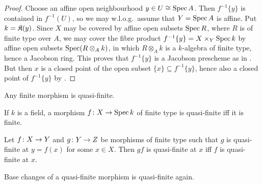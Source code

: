 \documentclass[a4paper,parskip=half,numbers=enddot, DIV=12]{scrreprt}
\begin{document}
\begin{proof}
	Choose an affine open neighbourhood $y\in U\cong \operatorname{Spec} A$. Then $f^{-1}\{y\}$ is contained in $f^{-1}(U)$, so we may w.l.o.g.\ assume that $Y=\operatorname{Spec} A$ is affine. Put $k=\mathfrak{K}(y)$. Since $X$ may be covered by affine open subsets $\operatorname{Spec} R$, where $R$ is of finite type over $A$, we may cover the fibre product $f^{-1}\{y\}=X\times_Y\operatorname{Spec} k$ by affine open subsets $\operatorname{Spec} (R\otimes_A k)$, in which $R\otimes_A k$ is a $k$-algebra of finite type, hence a Jacobson ring. This proves that $f^{-1}\{y\}$ is a Jacobson prescheme as in \cite[Definition~2.4.2]{alggeo1}. But then $x$ is a closed point of the open subset $\{x\}\subseteq f^{-1}\{y\}$, hence also a closed point of $f^{-1}\{y\}$ by \cite[Fact~2.4.1]{alggeo1}.
\end{proof}
\begin{fact}
	\begin{alphanumerate}
		\item {}Any finite morphism is quasi-finite.
		\item If $k$ is a field, a morphism $f\colon X\morphism\Spec k$ of finite type is quasi-finite iff it is finite.
		\item Let $f\colon X\morphism Y$ and $g\colon Y\morphism Z$ be morphisms of finite type such that $g$ is quasi-finite at $y=f(x)$ for some $x\in X$. Then $gf$ is quasi-finite at $x$ iff $f$ is quasi-finite at $x$.
		\item Base changes of a quasi-finite morphism is quasi-finite again.
	\end{alphanumerate}
\end{fact}
\end{document}

